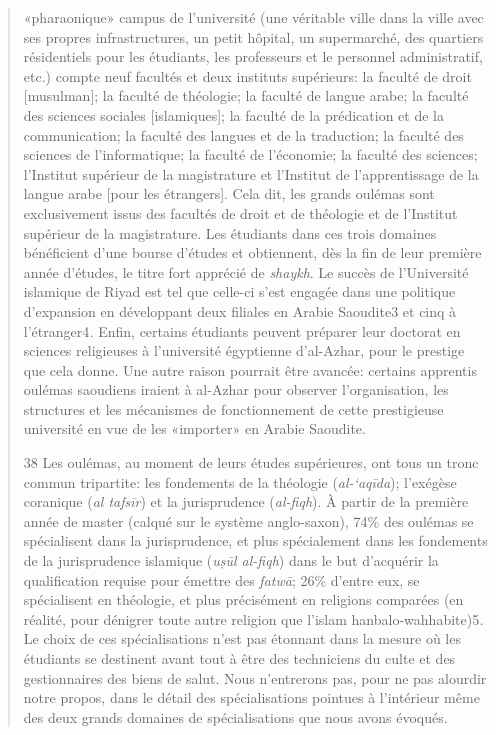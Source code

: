 \begin{quote}
«pharaonique» campus de l'université (une véritable ville dans la ville
avec ses propres infrastructures, un petit hôpital, un supermarché, des
quartiers résidentiels pour les étudiants, les professeurs et le
personnel administratif, etc.) compte neuf facultés et deux instituts
supérieurs: la faculté de droit {[}musulman{]}; la faculté de théologie;
la faculté de langue arabe; la faculté des sciences sociales
{[}islamiques{]}; la faculté de la prédication et de la communication;
la faculté des langues et de la traduction; la faculté des sciences de
l'informatique; la faculté de l'économie; la faculté des sciences;
l'Institut supérieur de la magistrature et l'Institut de l'apprentissage
de la langue arabe {[}pour les étrangers{]}. Cela dit, les grands
oulémas sont exclusivement issus des facultés de droit et de théologie
et de l'Institut supérieur de la magistrature. Les étudiants dans ces
trois domaines bénéficient d'une bourse d'études et obtiennent, dès la
fin de leur première année d'études, le titre fort apprécié de
\emph{shaykh}. Le succès de l'Université islamique de Riyad est tel que
celle-ci s'est engagée dans une politique d'expansion en développant
deux filiales en Arabie Saoudite3 et cinq à l'étranger4\emph{.} Enfin,
certains étudiants peuvent préparer leur doctorat en sciences
religieuses à l'université égyptienne d'al-Azhar, pour le prestige que
cela donne. Une autre raison pourrait être avancée: certains apprentis
oulémas saoudiens iraient à al-Azhar pour observer l'organisation, les
structures et les mécanismes de fonctionnement de cette prestigieuse
université en vue de les
«importer» en Arabie Saoudite.

38 Les oulémas, au moment de leurs études supérieures, ont tous un tronc
commun tripartite: les fondements de la théologie (\emph{al-`aqīda});
l'exégèse coranique (\emph{al tafsīr}) et la jurisprudence
(\emph{al-fiqh}). À partir de la première année de master (calqué sur le
système anglo-saxon), 74\% des oulémas se spécialisent dans la
jurisprudence, et plus spécialement dans les fondements de la
jurisprudence islamique (\emph{uṣūl al-fiqh}) dans le but d'acquérir la
qualification requise pour émettre des \emph{fatwā}; 26\% d'entre eux,
se spécialisent en théologie, et plus précisément en religions comparées
(en réalité, pour dénigrer toute autre religion que l'islam
hanbalo-wahhabite)5\emph{.} Le choix de ces spécialisations n'est pas
étonnant dans la mesure où les étudiants se destinent avant tout à être
des techniciens du culte et des gestionnaires des biens de salut. Nous
n'entrerons pas, pour ne pas alourdir notre propos, dans le détail des
spécialisations pointues à l'intérieur même des deux grands domaines de
spécialisations que nous avons évoqués.


\end{quote}
